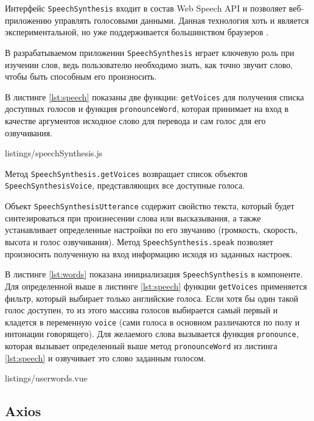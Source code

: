 Интерфейс \texttt{SpeechSynthesis} входит в состав Web Speech API и позволяет веб-приложению управлять голосовыми данными. Данная технология хоть и является экспериментальной, но уже поддерживается большинством браузеров \cite{speech}.

В разрабатываемом приложении \texttt{SpeechSynthesis} играет ключевую роль при изучении слов, ведь пользователю необходимо знать, как точно звучит слово, чтобы быть способным его произносить.

В листинге \ref{lst:speech} показаны две функции: \texttt{getVoices} для получения списка доступных голосов и функция \texttt{pronounceWord}, которая принимает на вход в качестве аргументов исходное слово для перевода и сам голос для его озвучивания.

\clearpage


{listings/speechSynthesis.js}

Метод \texttt{SpeechSynthesis.getVoices} возвращает список объектов \texttt{SpeechSynthesisVoice}, представляющих все доступные голоса.

Объект \texttt{SpeechSynthesisUtterance} содержит свойство текста, который будет синтезироваться при произнесении слова или высказывания, а также устанавливает определенные настройки по его звучанию (громкость, скорость, высота и голос озвучивания). Метод \texttt{SpeechSynthesis.speak} позволяет произносить полученную на вход информацию исходя из заданных настроек.

В листинге \ref{lst:words} показана инициализация \texttt{SpeechSynthesis} в компоненте. Для определенной выше в листинге \ref{lst:speech} функции \texttt{getVoices} применяется фильтр, который выбирает только английские голоса. Если хотя бы один такой голос доступен, то из этого массива голосов выбирается самый первый и кладется в переменную \texttt{voice} (сами голоса в основном различаются по полу и интонации говорящего). Для желаемого слова вызывается функция \texttt{pronounce}, которая вызывает определенный выше метод \texttt{pronounceWord} из листинга \ref{lst:speech} и озвучивает это слово заданным голосом.

\clearpage


{listings/userwords.vue}

\subsection{Axios}

